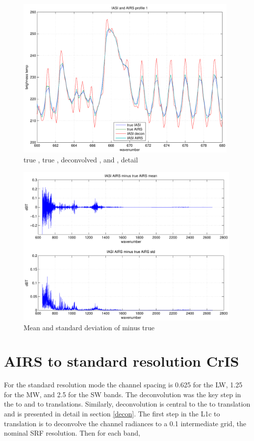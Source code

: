 \documentclass[12pt]{article}
\begin{document}
\begin{figure}
  \centering
  \includegraphics[height=8cm]{figures/iasi_airs_zoom.pdf}
  \caption{true {\iasi}, true {\airs}, deconvolved {\iasi}, and
    {\iasi} {\airs}, detail }
  \label{iazoom}
\end{figure}

\begin{figure}
  \centering
  \includegraphics[height=8cm]{figures/iasi_airs_diff.pdf}
  \caption{Mean and standard deviation of {\iasi} {\airs} minus true
    {\airs} }
  \label{iadiff}
\end{figure}

\FloatBarrier

\section{AIRS to standard resolution CrIS}
\label{airs2cris}

For the {\cris} standard resolution mode the channel spacing is
0.625 {\wn} for the LW, 1.25 {\wn} for the MW, and 2.5 {\wn} for the
SW bands.  The {\iasi} deconvolution was the key step in the {\iasi}
to {\cris} and {\iasi} to {\airs} translations.  Similarly, {\airs}
deconvolution is central to the {\airs} to {\cris} translation and
is presented in detail in section \ref{decon}.  The first step in
the {\airs} L1c to {\cris} translation is to deconvolve the {\airs}
channel radiances to a 0.1 {\wn} intermediate grid, the nominal
{\airs} SRF resolution.  Then for each {\cris} band,
\end{document}
